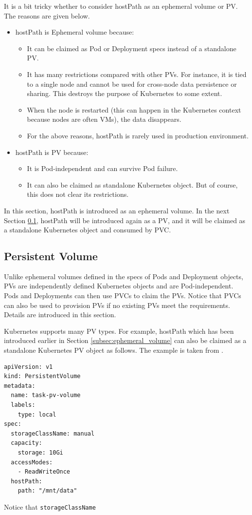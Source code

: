 It is a bit tricky whether to consider hostPath as an ephemeral volume or PV. The reasons are given below.
\begin{itemize}
	\item hostPath is Ephemeral volume because:
	\begin{itemize}
		\item It can be claimed as Pod or Deployment specs instead of a standalone PV.
		\item It has many restrictions compared with other PVs. For instance, it is tied to a single node and cannot be used for cross-node data persistence or sharing. This destroys the purpose of Kubernetes to some extent.
		\item When the node is restarted (this can happen in the Kubernetes context because nodes are often VMs), the data disappears.
		\item For the above reasons, hostPath is rarely used in production environment.
	\end{itemize}
	\item hostPath is PV because:
	\begin{itemize}
		\item It is Pod-independent and can survive Pod failure.
		\item It can also be claimed as standalone Kubernetes object. But of course, this does not clear its restrictions.
	\end{itemize}
\end{itemize}
In this section, hostPath is introduced as an ephemeral volume. In the next Section \ref{subsec:persistentvolume}, hostPath will be introduced again as a PV, and it will be claimed as a standalone Kubernetes object and consumed by PVC.

\subsection{Persistent Volume} \label{subsec:persistentvolume}

Unlike ephemeral volumes defined in the specs of Pods and Deployment objects, PVs are independently defined Kubernetes objects and are Pod-independent. Pods and Deployments can then use PVCs to claim the PVs. Notice that PVCs can also be used to provision PVs if no existing PVs meet the requirements. Details are introduced in this section.

Kubernetes supports many PV types. For example, hostPath which has been introduced earlier in Section \ref{subsec:ephemeral_volume} can also be claimed as a standalone Kubernetes PV object as follows. The example is taken from \cite{kubernetes2024doc}.
\begin{lstlisting}
apiVersion: v1
kind: PersistentVolume
metadata:
  name: task-pv-volume
  labels:
    type: local
spec:
  storageClassName: manual
  capacity:
    storage: 10Gi
  accessModes:
    - ReadWriteOnce
  hostPath:
    path: "/mnt/data"
\end{lstlisting}
Notice that \texttt{storageClassName}

